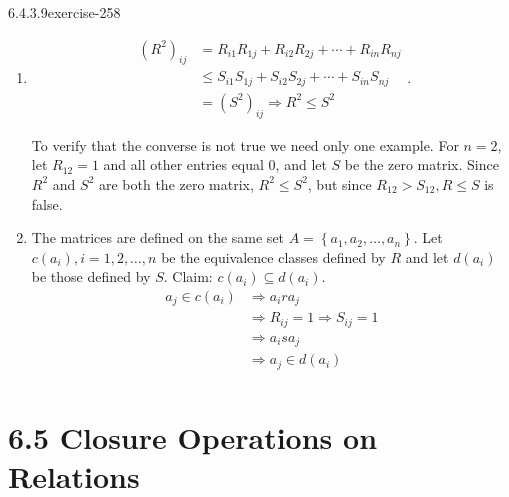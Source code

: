 \documentclass[twoside,10pt,]{book}
\numberwithin{equation}{section}
\begin{document}
\begin{divisionsolution}{6.4.3.9}{}{exercise-258}
\begin{enumerate}[label=(\alph*)]
\item\hypertarget{li-1153}{}\hypertarget{p-2183}{}%
%
\begin{equation*}
\begin{split}
\left(R^2\right)_{ij}&=R_{i1}R_{1j}+R_{i2}R_{2j}+\cdots +R_{in}R_{nj}\\
&\leq S_{i1}S_{1j}+S_{i2}S_{2j}+\cdots +S_{in}S_{nj}\\
&=\left(S^2\right)_{ij} \Rightarrow R^2\leq S^2
\end{split}\text{.}
\end{equation*}
%
\par
\hypertarget{p-2184}{}%
To verify that the converse is not true we need only one example. For \(n=2\), let \(R_{12}=1\) and all other entries equal \(0\), and let \(S\) be the zero matrix. Since \(R^2\) and \(S^2\) are both the zero matrix, \(R^2\leq S^2\), but since \(R_{12}>S_{12}, R\leq S\) is false.%
\item\hypertarget{li-1154}{}The matrices are defined on the same set \(A=\left\{a_1,a_2,\ldots  ,a_n\right\}\). Let \(c\left(a_i\right), i=1,2,\ldots  ,n\) be the equivalence classes defined by \(R\) and let \(d\left(a_i\right)\) be those defined by \(S\). Claim: \(c\left(a_i\right)\subseteq d\left(a_i\right)\).%
\begin{equation*}
\begin{split}
a_j\in c\left(a_i\right)&\Rightarrow a_i r a_j\\
&\Rightarrow R_{ij}=1 \Rightarrow S_{ij}=1\\
&\Rightarrow a_i s a_j\\ 
& \Rightarrow a_j \in d\left(a_i\right)\\
\end{split}
\end{equation*}
%
\end{enumerate}
%
\end{divisionsolution}%
\section*{6.5 Closure Operations on Relations}
\end{document}
